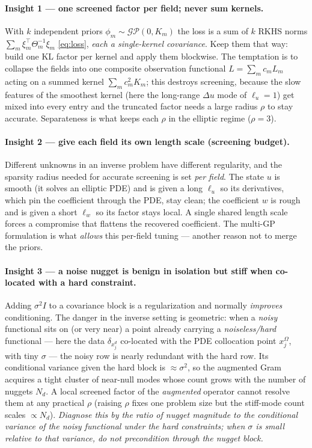 \documentclass[11pt]{article}
\newcommand{\T}{^{\!\top}}
\newcommand{\inv}{^{-1}}
\newcommand{\cGP}{\mathcal{GP}}
\newcommand{\Th}{\Theta}
\begin{document}
\paragraph{Insight 1 --- one screened factor per field; never sum kernels.}
With $k$ independent priors $\phi_m\sim\cGP(0,K_m)$ the loss is a sum of $k$
RKHS norms $\sum_m \xi_m\T\Th_m\inv\xi_m$ \eqref{eq:loss}, \emph{each a
single-kernel covariance}. Keep them that way: build one KL factor per kernel and
apply them blockwise. The temptation is to collapse the fields into one composite
observation functional $L=\sum_m c_m L_m$ acting on a summed kernel
$\sum_m c_m^2 K_m$; this destroys screening, because the slow features of the
smoothest kernel (here the long-range $\Delta u$ mode of $\ell_u=1$) get mixed
into every entry and the truncated factor needs a large radius $\rho$ to stay
accurate. Separateness is what keeps each $\rho$ in the elliptic regime
($\rho=3$).

\paragraph{Insight 2 --- give each field its own length scale (screening budget).}
Different unknowns in an inverse problem have different regularity, and the
sparsity radius needed for accurate screening is set \emph{per field}. The state
$u$ is smooth (it solves an elliptic PDE) and is given a long $\ell_u$ so its
derivatives, which pin the coefficient through the PDE, stay clean; the
coefficient $w$ is rough and is given a short $\ell_w$ so its factor stays local.
A single shared length scale forces a compromise that flattens the recovered
coefficient. The multi-GP formulation is what \emph{allows} this per-field tuning
--- another reason not to merge the priors.

\paragraph{Insight 3 --- a noise nugget is benign in isolation but stiff when
co-located with a hard constraint.} Adding $\sigma^2 I$ to a covariance block is
a regularization and normally \emph{improves} conditioning. The danger in the
inverse setting is geometric: when a \emph{noisy} functional sits on (or very
near) a point already carrying a \emph{noiseless/hard} functional --- here the
data $\delta_{x_j^d}$ co-located with the PDE collocation point $x_j^\Omega$, with
tiny $\sigma$ --- the noisy row is nearly redundant with the hard row. Its
conditional variance given the hard block is $\approx\sigma^2$, so the augmented
Gram acquires a tight cluster of near-null modes whose count grows with the
number of nuggets $N_d$. A local screened factor of the \emph{augmented} operator
cannot resolve them at any practical $\rho$ (raising $\rho$ fixes one problem
size but the stiff-mode count scales $\propto N_d$). \emph{Diagnose this by the
ratio of nugget magnitude to the conditional variance of the noisy functional
under the hard constraints; when $\sigma$ is small relative to that variance, do
not precondition through the nugget block.}
\end{document}
